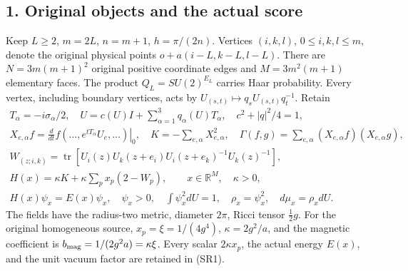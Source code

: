 \documentclass[11pt]{article}
\begin{document}
\subsection*{1. Original objects and the actual score}

Keep \(L\ge2\), \(m=2L\), \(n=m+1\), \(h=\pi/(2n)\). Vertices \((i,k,l)\), \(0\le i,k,l\le m\), denote the original physical points \(o+a(i-L,k-L,l-L)\). There are \(N=3m(m+1)^2\) original positive coordinate edges and \(M=3m^2(m+1)\) elementary faces. The product \(Q_L=SU(2)^{E_L}\) carries Haar probability. Every vertex, including boundary vertices, acts by \(U_{(s,t)}\mapsto q_sU_{(s,t)}q_t^{-1}\). Retain
\[
\begin{gathered}
T_\alpha=-i\sigma_\alpha/2,\quad
U=c(U)I+\sum_{\alpha=1}^3q_\alpha(U)T_\alpha,
\quad c^2+|q|^2/4=1,\\
X_{e,\alpha}f=\left.\frac d{dt}f(\ldots,e^{tT_\alpha}U_e,\ldots)\right|_{0},
\quad K=-\sum_{e,\alpha}X_{e,\alpha}^2,
\quad\Gamma(f,g)=\sum_{e,\alpha}(X_{e,\alpha}f)(X_{e,\alpha}g),\\
W_{(z;i,k)}=\operatorname{tr}[U_i(z)U_k(z+e_i)U_i(z+e_k)^{-1}U_k(z)^{-1}],\\
H(x)=\kappa K+\kappa\sum_p x_p(2-W_p),\qquad x\in\mathbb R^M,\quad\kappa>0,\\
H(x)\psi_x=E(x)\psi_x,\quad \psi_x>0,\quad\int\psi_x^2dU=1,
\quad\rho_x=\psi_x^2,\quad d\mu_x=\rho_xdU.
\end{gathered}\tag{SR1}
\]
The fields have the radius-two metric, diameter \(2\pi\), Ricci tensor \(\tfrac12 g\). For the original homogeneous source, \(x_p=\xi=1/(4g^4)\), \(\kappa=2g^2/a\), and the magnetic coefficient is \(b_{\rm mag}=1/(2g^2a)=\kappa\xi\). Every scalar \(2\kappa x_p\), the actual energy \(E(x)\), and the unit vacuum factor are retained in (SR1).
\end{document}
